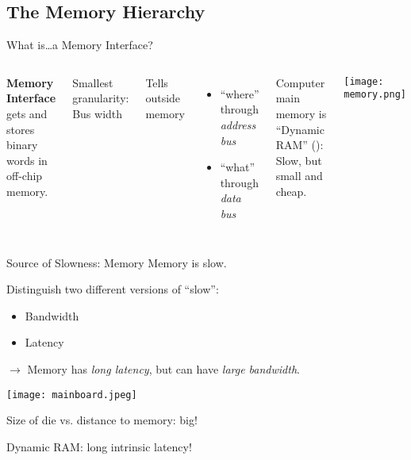 \documentclass[english,compress]{beamer}
\begin{document}
\subsection[Memory]{The Memory Hierarchy}

\begin{frame}{What is\dots a Memory Interface?}
  \begin{columns}
      \textbf{Memory Interface} gets and stores binary words in
      off-chip memory.
      \medskip

      Smallest granularity: Bus width
      \medskip

      Tells outside memory
      \begin{itemize}
        \item ``where'' through \emph{address bus}
        \item ``what'' through \emph{data bus}
      \end{itemize}

      Computer main memory is ``Dynamic RAM''
      ():
      Slow, but small and cheap.

      \texttt{[image: memory.png]}
  \end{columns}
\end{frame}
\begin{frame}{Source of Slowness: Memory}
  Memory is slow.
  \medskip

  Distinguish two different versions of ``slow'':
  \begin{itemize}
    \item Bandwidth
    \item Latency
  \end{itemize}
  $\rightarrow$ Memory has \emph{long latency}, but can have
  \emph{large bandwidth}.

  \begin{center}
  \texttt{[image: mainboard.jpeg]}
  \end{center}

  Size of die vs. distance to memory: big!

  \medskip
  Dynamic RAM: long intrinsic latency!

\end{frame}
\end{document}
